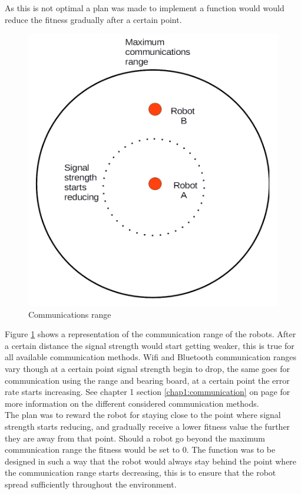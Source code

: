 As this is not optimal a plan was made to implement a function would would reduce the fitness gradually after a certain point. 

\begin{figure}[h]
\centering
\includegraphics[scale=0.5]{Chapter4/images/comms.png}
\caption{Communications range}
\label{fig:coms}
\end{figure}

Figure \ref{fig:coms} shows a representation of the communication range of the robots. After a certain distance the signal strength would start getting weaker, this is true for all available communication methods. Wifi and Bluetooth communication ranges vary though at a certain point signal strength begin to drop, the same goes for communication using the range and bearing board, at a certain point the error rate starts increasing. See chapter 1 section \ref{chap1:communication} on page \pageref{chap1:communication} for more information on the different considered communication methods. \\

The plan was to reward the robot for staying close to the point where signal strength starts reducing, and gradually receive a lower fitness value the further they are away from that point. Should a robot go beyond the maximum communication range the fitness would be set to 0. 
The function was to be designed in such a way that the robot would always stay behind the point where the communication range starts decreasing, this is to ensure that the robot spread sufficiently throughout the environment. \\


